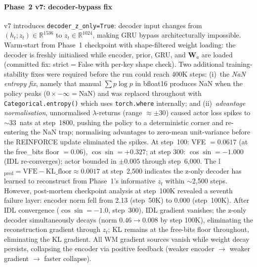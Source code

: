 \documentclass[journal,onecolumn,11pt]{IEEEtran}
\begin{document}
\paragraph{Phase~2 v7: decoder-bypass fix}
v7 introduces \texttt{decoder\_z\_only=True}: decoder input changes from
$(h_t; z_t) \in \mathbb{R}^{1536}$ to $z_t \in \mathbb{R}^{1024}$, making GRU bypass
architecturally impossible.
Warm-start from Phase~1 checkpoint with shape-filtered weight loading:
the decoder is freshly initialised while encoder, prior, GRU, and $\mathbf{W}_a$
are loaded (committed fix: strict$=$False with per-key shape check).
Two additional training-stability fixes were required before the run could reach 400K steps:
(i)~the \emph{NaN entropy fix}, namely that manual $\sum p \log p$ in
bfloat16 produces NaN when the policy peaks ($0 \times -\infty = \text{NaN}$)
and was replaced throughout with \texttt{Categorical.entropy()} which uses
\texttt{torch.where} internally; and (ii)~\emph{advantage normalisation},
unnormalised $\lambda$-returns (range $\approx\pm30$) caused actor loss spikes to $\sim33$~nats
at step~1800, pushing the policy to a deterministic corner and re-entering the NaN trap;
normalising advantages to zero-mean unit-variance before the REINFORCE update eliminated the spikes.
At step~100: VFE $= 0.0617$ (at the free\_bits floor $= 0.06$), $\cos\!\sin = +0.327$;
at step 300: $\cos\!\sin = -1.000$ (IDL re-converges); actor bounded in $\pm0.005$ through step~6{,}000.
The l$_{\text{pred}} = \text{VFE} - \text{KL\_floor} \approx 0.0017$ at step~2{,}500
indicates the z-only decoder has learned to reconstruct from Phase~1's informative $z_t$
within $\sim$2{,}500 steps.
However, post-mortem checkpoint analysis at step~100K revealed a seventh failure layer:
encoder norm fell from 2.13 (step~50K) to 0.000 (step~100K).
After IDL convergence ($\cos\!\sin = -1.0$, step~300), IDL gradient vanishes;
the z-only decoder simultaneously decays (norm $0.46{\to}0.008$ by step 100K),
eliminating the reconstruction gradient through $z_t$;
KL remains at the free-bits floor throughout, eliminating the KL gradient.
All WM gradient sources vanish while weight decay persists, collapsing the encoder
via positive feedback (weaker encoder $\to$ weaker gradient $\to$ faster collapse).
\end{document}
